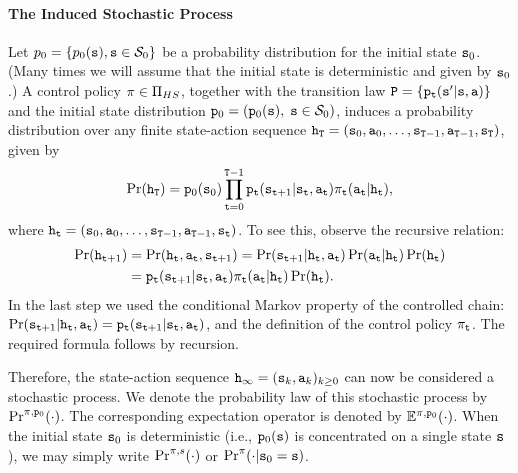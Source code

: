 \paragraph{The Induced Stochastic Process}
Let  ${p_0} = \{ {p_0}({\tt s}),{\tt s} \in {\mathcal{S}_0}\} $ be a
probability distribution for the initial state ${{\tt s}_0}$. (Many
times we will assume that the initial state is deterministic and
given by ${\tt s}_0$.) A control policy $\pi \in {\Pi _{HS}}$,
together with the transition law ${\tt P} = \{
{{\tt p}_{\tt t}}({\tt s}'|{\tt s},{\tt a})\} $ and the initial state
distribution ${{\tt p}_0} = ({{\tt p}_0}({\tt s}),\;{\tt s} \in {\mathcal{S}_0})$,
induces a probability distribution over any finite state-action
sequence ${{\tt h}_{\tt T}} = ({{\tt s}_0},{{\tt a}_0}, \ldots
,{{\tt s}_{{\tt T} - 1}},{{\tt a}_{{\tt T} -
1}},{{\tt s}_{\tt T}})$, given by
\[\Pr({{\tt h}_{\tt T}}) = {{\tt p}_0}({{\tt s}_0})\prod\limits_{{\tt t} = 0}^{{\tt T} -1} {{\tt p}_{\tt t}({{\tt s}_{{\tt t} + 1}}|{{\tt s}_{\tt t}},{{\tt a}_{\tt t}}){\pi _{\tt t}}({{\tt a}_{\tt t}}|{{\tt h}_{\tt t}})} ,\]
where ${{\tt h}_{\tt t}} = ({{\tt s}_0},{{\tt a}_0}, \ldots
,{{\tt s}_{{\tt T} -1}},{{\tt a}_{{\tt T} -1}},{{\tt s}_{\tt t}})$.
%
To see this, observe the recursive relation:
\begin{align*}
\Pr({{\tt h}_{{\tt t} + 1}}) &= \Pr({{\tt h}_{\tt t}},{{\tt a}_{\tt t}},{{\tt s}_{{\tt t} + 1}}) = \Pr({{\tt s}_{{\tt t} + 1}}|{{\tt h}_{\tt t}},{{\tt a}_{\tt t}})\Pr({{\tt a}_{\tt t}}|{{\tt h}_{\tt t}})\Pr({{\tt h}_{\tt t}})\\
 &= {{\tt p}_{\tt t}}({{\tt s}_{{\tt t} + 1}}|{{\tt s}_{\tt t}},{{\tt a}_{\tt t}}){\pi _{\tt t}}({{\tt a}_{\tt t}}|{{\tt h}_{\tt t}})\Pr({{\tt h}_{\tt t}}).
\end{align*}
In the last step we used the conditional Markov property of the
controlled chain: $\Pr({{\tt s}_{{\tt t} +
1}}|{{\tt h}_{\tt t}},{{\tt a}_{\tt t}}) = {{\tt p}_{\tt t}}({{\tt s}_{{\tt t}
+ 1}}|{{\tt s}_{\tt t}},{{\tt a}_{\tt t}})$, and the definition of the
control policy $\pi_{\tt t} $. The required formula follows by
recursion.

Therefore, the state-action sequence ${{\tt h}_\infty } =
{({{\tt s}_k},{{\tt a}_k})_{k \ge 0}}$ can now be considered a
stochastic process. We denote the probability law of this stochastic
process by ${\Pr^{\pi ,{{\tt p}_0}}}( \cdot )$. The corresponding
expectation operator is denoted by ${\mathbb{E}^{\pi ,{{\tt p}_0}}}( \cdot )$.
When the initial state ${{\tt s}_0}$ is deterministic (i.e.,
${{\tt p}_0}({\tt s})$ is concentrated on a single state ${\tt s}$), we may
simply write ${\Pr^{\pi ,s}}( \cdot )$  or ${\Pr^\pi }( \cdot
|{{\tt s}_0} = {\tt s})$.


